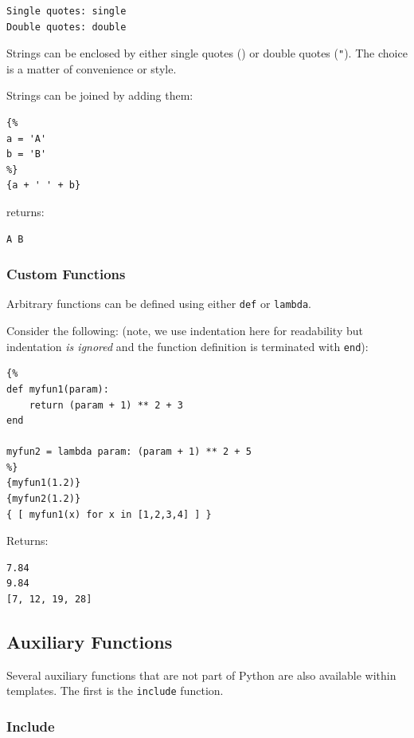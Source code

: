 {\begin{verbatim}
Single quotes: single
Double quotes: double
\end{verbatim}

Strings can be enclosed by either single quotes (\texttt{\textquotesingle{}}) 
or double quotes (\texttt{"}). The choice is a matter of convenience or style.

Strings can be joined by adding them:

\begin{verbatim}
{%
a = 'A'
b = 'B'
%}
{a + ' ' + b}
\end{verbatim}

returns:

\begin{verbatim}
A B
\end{verbatim}

\subsubsection{Custom Functions}\label{interfaces:custom-functions}

Arbitrary functions can be defined using either \texttt{def} or
\texttt{lambda}. 

Consider the following: (note, we use indentation here for readability
but indentation \emph{is ignored} and the function definition is
terminated with \texttt{end}):

\begin{verbatim}
{%
def myfun1(param):
    return (param + 1) ** 2 + 3
end

myfun2 = lambda param: (param + 1) ** 2 + 5
%}
{myfun1(1.2)}
{myfun2(1.2)}
{ [ myfun1(x) for x in [1,2,3,4] ] }
\end{verbatim}

Returns:

\begin{verbatim}
7.84
9.84
[7, 12, 19, 28]
\end{verbatim}

\subsection{Auxiliary Functions}\label{interfaces:auxiliary-functions}

Several auxiliary functions that are not part of Python are also available 
within templates. The first is the \texttt{include} function.

\subsubsection{Include}\label{interfaces:include}

}
